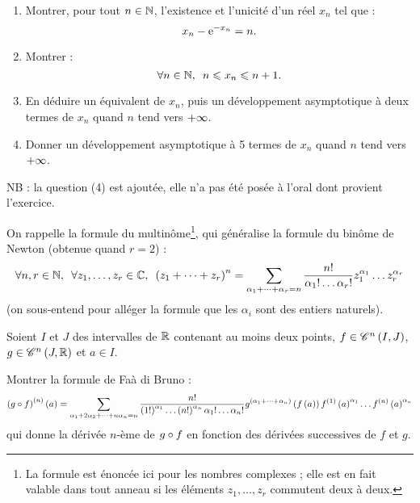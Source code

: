 \begin{exo}[Oral 2016]
\begin{enumerate}
\item Montrer, pour tout \(n\in\mathbb{N}\), l'existence et l'unicité d'un réel \(x_n\) tel que : \[x_n-\mathrm{e}^{-x_n}=n.\]

\item Montrer : \[\quantifs{\forall n\in\N}n\leq x_n\leq n+1.\]

\item En déduire un équivalent de \(x_n\), puis un développement asymptotique à deux termes de \(x_n\) quand \(n\) tend vers \(+\infty\). \\

\item Donner un développement asymptotique à 5 termes de \(x_n\) quand \(n\) tend vers \(+\infty\).
\end{enumerate}

NB : la question (4) est ajoutée, elle n'a pas été posée à l'oral dont provient l'exercice.
\end{exo}

\begin{corr}
\end{corr}

\begin{exo}
On rappelle la formule du multinôme\footnote{La formule est énoncée ici pour les nombres complexes ; elle est en fait valable dans tout anneau si les éléments \(z_1,\dots,z_r\) commutent deux à deux.}, qui généralise la formule du binôme de Newton (obtenue quand \(r=2\)) : \[\quantifs{\forall n,r\in\N;\forall z_1,\dots,z_r\in\C}\paren{z_1+\dots+z_r}^n=\sum_{\alpha_1+\dots+\alpha_r=n}\dfrac{n!}{\alpha_1!\dots\alpha_r!}z_1^{\alpha_1}\dots z_r^{\alpha_r}\] (on sous-entend pour alléger la formule que les \(\alpha_i\) sont des entiers naturels).

Soient \(I\) et \(J\) des intervalles de \(\mathbb{R}\) contenant au moins deux points, \(f\in\mathscr{C}^{n}\left(I,J\right)\), \(g\in\mathscr{C}^{n}\left(J,\mathbb{R}\right)\) et \(a\in I\).

Montrer la formule de Faà di Bruno : \[\left(g\circ f\right)^{\left(n\right)}\left(a\right)=\sum_{\alpha_1+2\alpha_2+\dots+n\alpha_n=n}\dfrac{n!}{\left(1!\right)^{\alpha_1}\dots\left(n!\right)^{\alpha_n}\alpha_1!\dots\alpha_n!}g^{\left(\alpha_1+\dots+\alpha_n\right)}\left(f\left(a\right)\right)f^{\left(1\right)}\left(a\right)^{\alpha_1}\dots f^{\left(n\right)}\left(a\right)^{\alpha_n}\] qui donne la dérivée \(n\)-ème de \(g\circ f\) en fonction des dérivées successives de \(f\) et \(g\).
\end{exo}

